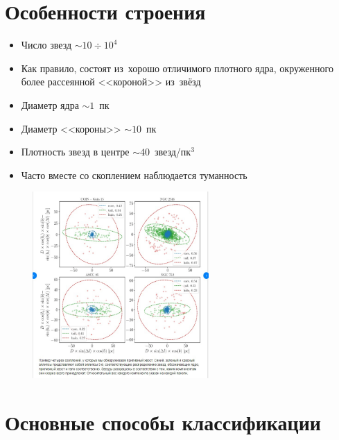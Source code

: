 \documentclass{beamer}
\begin{document}
    \section{Особенности строения}
    \begin{frame}
        \begin{itemize}
            \item Число звезд $\sim 10 \div 10^4$
            \item Как правило, состоят из~хорошо отличимого плотного ядра, окруженного более рассеянной <<короной>> из~звёзд
            \item Диаметр ядра $\sim 1$~пк
            \item Диаметр <<короны>> $\sim 10$~пк
            \item Плотность звезд в центре $\sim 40$~звезд/пк$^3$
            \item Часто вместе со скоплением наблюдается туманность
        \end{itemize}
    \end{frame}
    \begin{frame}
        \begin{figure}
            \centering
                \includegraphics[width=0.6\textwidth]{pictures/Class1.jpg}
        \end{figure}
    \end{frame}
    \section{Основные способы классификации}
\end{document}
